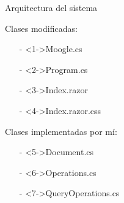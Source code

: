 \begin{frame}{Arquitectura del sistema}
\begin{center}
    \begin{block}{Clases modificadas:}
            \begin{itemize}
                \item[-]<1->{Moogle.cs}
                \item[-]<2->{Program.cs} 
                \item[-]<3->{Index.razor} 
                \item[-]<4->{Index.razor.css}    
            \end{itemize}
    \end{block}

    \pause

    \begin{block}{Clases implementadas por mí:}
            \begin{itemize}
                \item[-]<5->{Document.cs} 
                \item[-]<6->{Operations.cs} 
                \item[-]<7->{QueryOperations.cs}   
            \end{itemize}
    \end{block}
\end{center}
\end{frame}